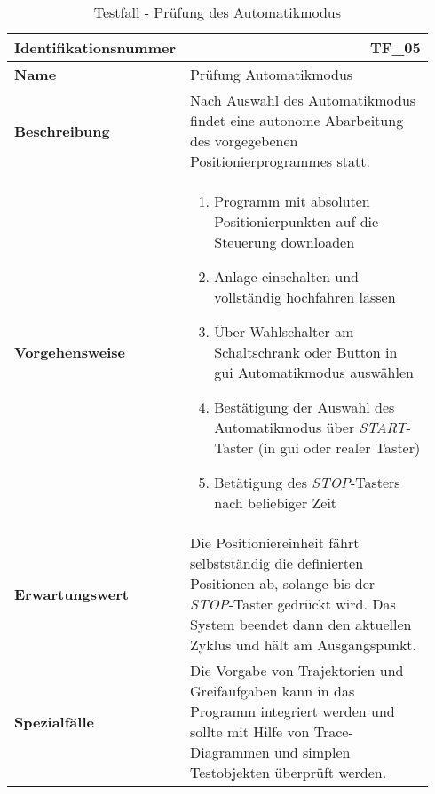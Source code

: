 \documentclass[../../../Bachelorarbeit.tex]{subfiles}
\begin{document}
\begin{table}[H]
    \centering
    \begin{tabular}{ p{0.34\linewidth}  p{0.6\linewidth} }
        \hline
        \textbf{Identifikationsnummer}  & \multicolumn{1}{r}{TF\_05} \\ \hline
        \textbf{Name}                   & Prüfung Automatikmodus \\
        \textbf{Beschreibung}           & Nach Auswahl des Automatikmodus findet eine autonome Abarbeitung des vorgegebenen Positionierprogrammes statt. \\
        \textbf{Vorgehensweise}         &   {\begin{enumerate}[noitemsep,topsep=0pt,parsep=0pt,partopsep=0pt,leftmargin=*]
                                                \item Programm mit absoluten Positionierpunkten auf die Steuerung downloaden
                                                \item Anlage einschalten und vollständig hochfahren lassen
                                                \item Über Wahlschalter am Schaltschrank oder Button in \acs{gui} Automatikmodus auswählen
                                                \item Bestätigung der Auswahl des Automatikmodus über \textit{START}-Taster (in \acs{gui} oder realer Taster)
                                                \item Betätigung des \textit{STOP}-Tasters nach beliebiger Zeit
                                            \end{enumerate}} \\
        \textbf{Erwartungswert}         & Die Positioniereinheit fährt selbstständig die definierten Positionen ab, solange bis der \textit{STOP}-Taster gedrückt wird. Das System beendet dann den aktuellen Zyklus und hält am Ausgangspunkt. \\
        \textbf{Spezialfälle}           & Die Vorgabe von Trajektorien und Greifaufgaben kann in das Programm integriert werden und sollte mit Hilfe von Trace-Diagrammen und simplen Testobjekten überprüft werden. \\ \hline
    \end{tabular}
    \caption[\acs{tf} - Automatikmodus]{Testfall - Prüfung des Automatikmodus}
    \label{tab:my-table64}
\end{table}
\end{document}
